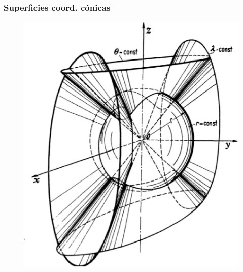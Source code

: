 \documentclass[12pt]{beamer}
\begin{document}
\begin{frame}
\frametitle{Superficies coord. cónicas}
\begin{figure}[H]
\centering
\includegraphics[scale=0.3]{Imagenes/Sistema_Conico.eps}
\end{figure}
\end{frame}
\end{document}
